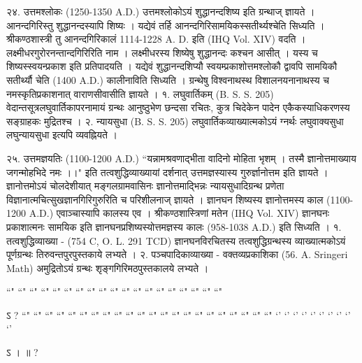 २४. उत्तमश्लोकः (1250-1350 A.D.)
उत्तमश्लोकोऽयं शुद्धानन्दशिष्य इति ग्रन्थाज् ज्ञायते । आनन्दगिरिस्तु शुद्धानन्दस्यापि शिष्यः । यद्येवं तर्हि आनन्दगिरिसामयिकस्सतीर्थ्यश्चेति सिध्यति । श्रीकण्ठशास्त्री तु आनन्दगिरिकालं 1114-1228 A. D. इति (IHQ Vol. XIV) वदति । लक्ष्मीधरगुरोरनन्तान्दगिरिरिति नाम । लक्ष्मीधरस्य शिष्येषु शुद्धानन्दः कश्चन आसीत् । यस्य च शिष्यस्स्वयन्प्रकाश इति प्रतिपादयति । यद्येवं शुद्धानन्दशिप्यौ स्वयम्प्रकाशोत्तमश्लोकौ द्वावपि सामयिकौ सतीर्थ्यौ चेति (1400 A.D.) कालीनाविति सिध्यति । ग्रन्थेषु विश्वनाथस्थ विशालनयनानाथस्य च नमस्कृतिप्रकाशनात् वाराणसीवासीति ज्ञायते ।
१. लघुवार्तिकम् (B. S. S. 205)
वेदान्तसूत्रलघुवार्तिकापरनामायं ग्रन्थः आनुष्ठुभेण छन्दसा रचितः, कुत्र चिदेकेन पादेन एकैकस्याधिकरणस्य सङ्ग्राहकः मुद्रितश्च ।
२. न्यायसुधा (B. S. S. 205)
लघुवार्तिकव्याख्यात्मकोऽयं ग्नर्थः लघुवाक्यसुधा लघुन्यायसुधा इत्यपि व्यवह्नियते ।

२५. उत्तमज्ञयतिः (1100-1200 A.D.)
``यन्नामश्रवणाद्भीता वादिनो मोहिता भृशम् ।
तस्मै ज्ञानोत्तमाख्याय जगन्मोहभिदे नमः ।।"
इति तत्वशुद्धिव्याख्यायां दर्शनात् उत्तमज्ञस्यास्य गुरुर्ज्ञानोत्तम इति ज्ञायते । ज्ञानोत्तमोऽयं चोलदेशीयात् मङ्गलग्रामवासिनः ज्ञानोत्तमाद्भिन्नः न्यायसुधादिग्रन्थ प्रणेता विज्ञानात्मचित्सुखज्ञानगिरिगुरुरिति च परिशीलनाज् ज्ञायते । ज्ञानघन शिष्यस्य ज्ञानोत्तमस्य काल (1100-1200 A.D.) एवाञ्चास्यापि कालस्य एव ।
श्रीकण्ठशास्त्रिणां मतेन (IHQ Vol. XIV) ज्ञानघनः प्रकाशात्मनः सामयिक इति ज्ञानघनप्रशिष्यस्योत्तमज्ञस्य कालः (958-1038 A.D.) इति सिध्यति ।
१. तत्वशुद्धिव्याख्या - (754 C, O. L. 291 TCD) ज्ञानघनविरचितस्य तत्वशुद्धिग्रन्थस्य व्याख्यात्मकोऽयं पूर्णग्रन्थः तिरुवन्तपुरपुस्तकाये लभ्यते ।
२. पञ्चपादिकाव्याख्या - वक्तव्यप्रकाशिका (56. A. Sringeri Math) अमुद्रितोऽयं ग्रन्थः शृङ्गगिरिमठपुस्तकालये लभ्यते ।



 ``" ``" ``" ``" ``" ``" ``" ``" ``" ``" ``" ``" ``" ``" ``" ``" ``" ``" ``"

ऽ  ?
``" ``" ``" ``" ``" ``" ``" ``" ``" ``" ``" ``" ``" ``" ``" ``" ``" ``" ``" ``" ``" ``"
`' `' `' `' `' `' `' `' `' `' 

ऽ  ।   ॥ ?
